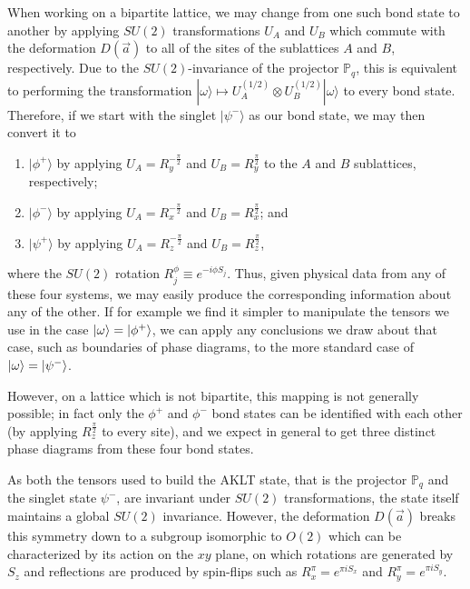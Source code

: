 \documentclass[aps,prb,letterpaper,superscriptaddress,twocolumn,showpacs,floatfix,10pt]{revtex4-1}
\begin{document}
When working on a bipartite lattice, we may change from one such
bond state to another
by applying $SU(2)$ transformations $U_A$ and $U_B$ which commute with the
deformation $D(\vec{a})$ to all of the sites of
the sublattices $A$ and $B$, respectively. Due to the $SU(2)$-invariance of
the projector $\mathbb{P}_q$, this is equivalent to performing the
transformation $|\omega\rangle \mapsto
U_A^{(1/2)}\otimes U_B^{(1/2)}|\omega\rangle$ to every bond state.
Therefore, if we start with the singlet $|\psi^-\rangle$ as our bond state,
we may then convert it to
\begin{enumerate}[i]
\item $|\phi^+\rangle$ by applying $U_A = R_y^{-\frac{\pi}{2}}$
and $U_B = R_y^\frac{\pi}{2}$ to the $A$ and $B$ sublattices, respectively;
\item $|\phi^-\rangle$ by applying $U_A = R_x^{-\frac{\pi}{2}}$ and
$U_B = R_x^{\frac{\pi}{2}}$; and
\item $|\psi^+\rangle$ by applying $U_A = R_z^{-\frac{\pi}{2}}$ and
$U_B = R_z^{\frac{\pi}{2}}$,
\end{enumerate}
where the $SU(2)$ rotation $R_j^\phi \equiv e^{-i\phi S_j}$.
Thus, given physical data from any of these four systems, we may easily
produce the corresponding
information about any of the other. If for example
 we find it simpler to manipulate the tensors we use in the case
$\vert\omega\rangle = \vert\phi^+\rangle$, we can apply any conclusions
we draw about that case,
such as boundaries of phase diagrams, to the more standard case of
$\vert\omega\rangle=\vert\psi^-\rangle$.

However, on a lattice which is not bipartite, this mapping is not generally
possible; in fact only the $\phi^+$ and $\phi^-$ bond states can be identified
with each other (by applying $R_z^\frac{\pi}{2}$ to every site), and we
expect in general to get three distinct phase diagrams from these four
bond states.

As both the tensors used to build the AKLT state, that is
the projector $\mathbb{P}_q$ and the
singlet state $\psi^-$, are invariant under $SU(2)$ transformations,
the state itself maintains a global $SU(2)$ invariance. However, the deformation
$D(\vec{a})$ 
breaks this symmetry down to a subgroup isomorphic to $O(2)$ which
can be characterized by its action on the $xy$ plane, on which rotations are
generated by $S_z$ and reflections are produced by spin-flips such
as $R^\pi_x = e^{\pi i S_x}$ and $R^\pi_y = e^{\pi i S_y}$.
\end{document}
